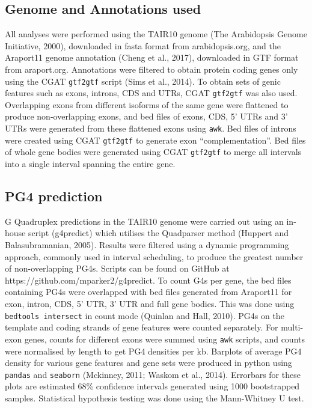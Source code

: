 \documentclass[12pt,a4paper,]{report}
\begin{document}
\hypertarget{genome-and-annotations-used}{%
\subsection{Genome and Annotations
used}\label{genome-and-annotations-used}}

All analyses were performed using the TAIR10 genome (The Arabidopsis
Genome Initiative, 2000), downloaded in fasta format from
arabidopsis.org, and the Araport11 genome annotation (Cheng et al.,
2017), downloaded in GTF format from araport.org. Annotations were
filtered to obtain protein coding genes only using the CGAT
\texttt{gtf2gtf} script (Sims et al., 2014). To obtain sets of genic
features such as exons, introns, CDS and UTRs, CGAT \texttt{gtf2gtf} was
also used. Overlapping exons from different isoforms of the same gene
were flattened to produce non-overlapping exons, and bed files of exons,
CDS, 5' UTRs and 3' UTRs were generated from these flattened exons using
\texttt{awk}. Bed files of introns were created using CGAT
\texttt{gtf2gtf} to generate exon ``complementation''. Bed files of
whole gene bodies were generated using CGAT \texttt{gtf2gtf} to merge
all intervals into a single interval spanning the entire gene.

\hypertarget{pg4-prediction}{%
\subsection{PG4 prediction}\label{pg4-prediction}}

G Quadruplex predictions in the TAIR10 genome were carried out using an
in-house script (g4predict) which utilises the Quadparser method
(Huppert and Balasubramanian, 2005). Results were filtered using a
dynamic programming approach, commonly used in interval scheduling, to
produce the greatest number of non-overlapping PG4s. Scripts can be
found on GitHub at https://github.com/mparker2/g4predict. To count G4s
per gene, the bed files containing PG4s were overlapped with bed files
generated from Araport11 for exon, intron, CDS, 5' UTR, 3' UTR and full
gene bodies. This was done using \texttt{bedtools\ intersect} in count
mode (Quinlan and Hall, 2010). PG4s on the template and coding strands
of gene features were counted separately. For multi-exon genes, counts
for different exons were summed using \texttt{awk} scripts, and counts
were normalised by length to get PG4 densities per kb. Barplots of
average PG4 density for various gene features and gene sets were
produced in python using \texttt{pandas} and \texttt{seaborn} (Mckinney,
2011; Waskom et al., 2014). Errorbars for these plots are estimated 68\%
confidence intervals generated using 1000 bootstrapped samples.
Statistical hypothesis testing was done using the Mann-Whitney U test.
\end{document}
